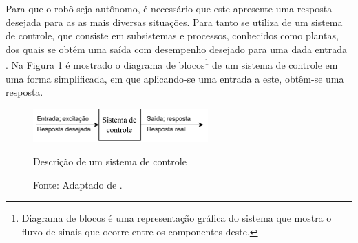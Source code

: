 Para que o robô seja autônomo, %
é necessário que este apresente uma resposta desejada para as 
as mais diversas situações. 
Para tanto se utiliza de um sistema de controle, que consiste em subsistemas e processos, conhecidos como plantas, 
dos quais se obtém uma saída com desempenho desejado para uma dada entrada \cite{nise}. Na Figura 
\ref{fig:basicdiag} é mostrado o diagrama de blocos\footnote{Diagrama de blocos é uma representação gráfica do sistema que mostra o 
fluxo de sinais que ocorre entre os componentes deste.} de 
um sistema de controle em uma forma simplificada, em que aplicando-se uma entrada a este, obtêm-se uma 
resposta. 

\begin{figure}[h]
 \centering
 \captionsetup{width=0.6\textwidth,font=footnotesize,textfont=bf}
 \includegraphics[width=0.6\textwidth]{figuras/DiagramaNise.png}
 \caption{Descrição de um sistema de controle \label{fig:basicdiag}}
  \vspace{-0.3cm}
 \caption*{Fonte: Adaptado de \cite[p.2]{nise}.}
\end{figure}


